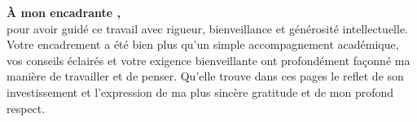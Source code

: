 \vspace{0.8cm}

\noindent\textbf{À mon encadrante \NomEncadrante,}\\
pour avoir guidé ce travail avec rigueur, bienveillance et générosité intellectuelle. Votre encadrement a été bien plus qu'un simple accompagnement académique, vos conseils éclairés et votre exigence bienveillante ont profondément façonné ma manière de travailler et de penser. Qu'elle trouve dans ces pages le reflet de son investissement et l'expression de ma plus sincère gratitude et de mon profond respect.
